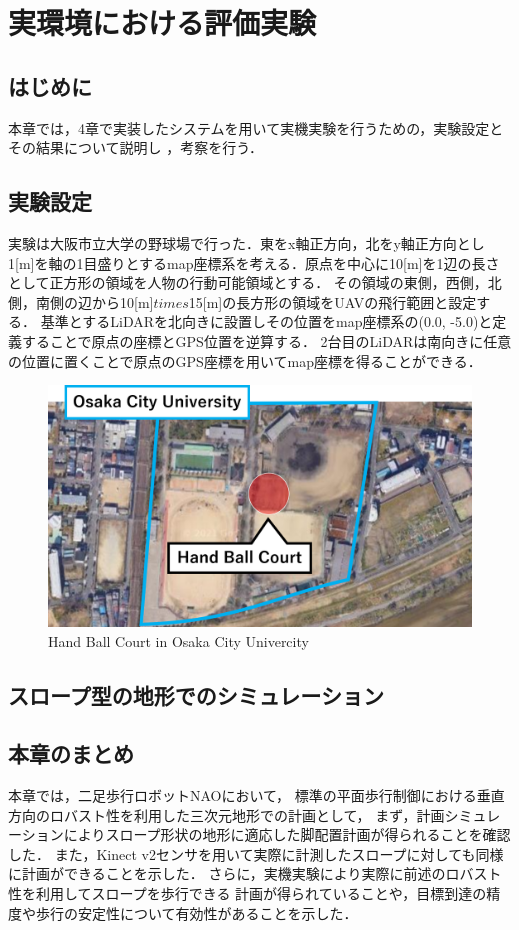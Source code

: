 \documentclass[autodetect-engine,dvipdfmx-if-dvi,ja=standard,a4j,jbase=11pt,magstyle=nomag*]{bxjsreport}
\begin{document}
\chapter[実環境における評価実験]{実環境における評価実験}
\label{chap:sim_nao}


\section{はじめに}
本章では，4章で実装したシステムを用いて実機実験を行うための，実験設定とその結果について説明し
，考察を行う．



\section{実験設定}
実験は大阪市立大学の野球場で行った．東をx軸正方向，北をy軸正方向とし
1[m]を軸の1目盛りとするmap座標系を考える．原点を中心に10[m]を1辺の長さとして正方形の領域を人物の行動可能領域とする．
その領域の東側，西側，北側，南側の辺から10[m]$times$15[m]の長方形の領域をUAVの飛行範囲と設定する．
基準とするLiDARを北向きに設置しその位置をmap座標系の(0.0, -5.0)と定義することで原点の座標とGPS位置を逆算する．
2台目のLiDARは南向きに任意の位置に置くことで原点のGPS座標を用いてmap座標を得ることができる．

\begin{figure}[t]
    \centering
    \includegraphics[width=\linewidth, clip]{./figure/chapter5/ground.png}
    \caption{Hand Ball Court in Osaka City Univercity}
    \label{fig:ground}
\end{figure}


\section{スロープ型の地形でのシミュレーション}



\section{本章のまとめ}
本章では，二足歩行ロボットNAOにおいて，
標準の平面歩行制御における垂直方向のロバスト性を利用した三次元地形での計画として，
まず，計画シミュレーションによりスロープ形状の地形に適応した脚配置計画が得られることを確認した．
また，Kinect v2センサを用いて実際に計測したスロープに対しても同様に計画ができることを示した．
さらに，実機実験により実際に前述のロバスト性を利用してスロープを歩行できる
計画が得られていることや，目標到達の精度や歩行の安定性について有効性があることを示した．
\end{document}

